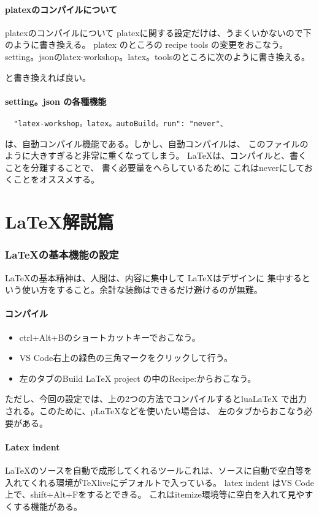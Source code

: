 \documentclass{ltjsarticle}
\begin{document}
\subsection{platexのコンパイルについて}
platexのコンパイルについて
platexに関する設定だけは、うまくいかないので下のように書き換える。
platex のところの
recipe tools の変更をおこなう。
setting。jsonのlatex-workshop。latex。toolsのところに次のように書き換える。

と書き換えれば良い。
\subsection{setting。json の各種機能}
\begin{verbatim}
  "latex-workshop。latex。autoBuild。run": "never"、
\end{verbatim}
は、自動コンパイル機能である。しかし、自動コンパイルは、
このファイルのように大きすぎると非常に重くなってしまう。
\LaTeX は、コンパイルと、書くことを分離することで、
書く必要量をへらしているために
これはneverにしておくことをオススメする。

\part{\LaTeX 解説篇}
\section{\LaTeX の基本機能の設定}
\LaTeX の基本精神は、人間は、内容に集中して \LaTeX はデザインに
集中するという使い方をすること。余計な装飾はできるだけ避けるのが無難。
\subsection{コンパイル}
\begin{itemize}
  \item ctrl+Alt+Bのショートカットキーでおこなう。
  \item VS Code右上の緑色の三角マークをクリックして行う。
  \item 左のタブのBuild LaTeX project の中のRecipe:からおこなう。
\end{itemize}
ただし、今回の設定では、上の2つの方法でコンパイルするとlua\LaTeX
で出力される。このために、pLaTeXなどを使いたい場合は、
左のタブからおこなう必要がある。
\subsection{Latex indent}
LaTeXのソースを自動で成形してくれるツールこれは、ソースに自動で空白等を
入れてくれる環境がTeXliveにデフォルトで入っている。
latex indent はVS Code上で、shift+Alt+Fをするとできる。
これはitemize環境等に空白を入れて見やすくする機能がある。
\end{document}
